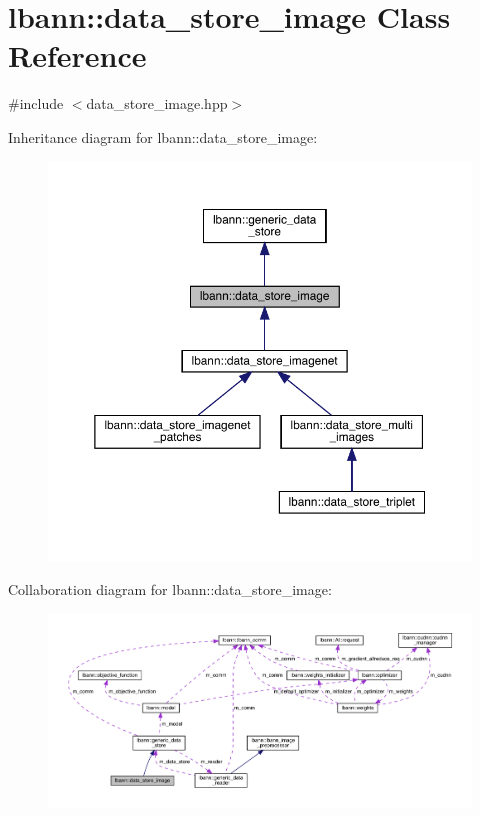 \hypertarget{classlbann_1_1data__store__image}{}\section{lbann\+:\+:data\+\_\+store\+\_\+image Class Reference}
\label{classlbann_1_1data__store__image}


{\ttfamily \#include $<$data\+\_\+store\+\_\+image.\+hpp$>$}



Inheritance diagram for lbann\+:\+:data\+\_\+store\+\_\+image\+:\nopagebreak
\begin{figure}[H]
\begin{center}
\leavevmode
\includegraphics[width=350pt]{classlbann_1_1data__store__image__inherit__graph}
\end{center}
\end{figure}


Collaboration diagram for lbann\+:\+:data\+\_\+store\+\_\+image\+:\nopagebreak
\begin{figure}[H]
\begin{center}
\leavevmode
\includegraphics[width=350pt]{classlbann_1_1data__store__image__coll__graph}
\end{center}
\end{figure}

